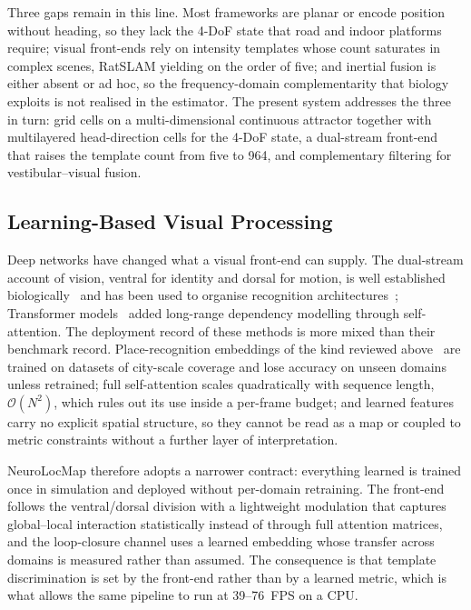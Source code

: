 Three gaps remain in this line. Most frameworks are planar or encode position without heading, so they lack the 4-DoF state that road and indoor platforms require; visual front-ends rely on intensity templates whose count saturates in complex scenes, RatSLAM yielding on the order of five; and inertial fusion is either absent or ad hoc, so the frequency-domain complementarity that biology exploits is not realised in the estimator. The present system addresses the three in turn: grid cells on a multi-dimensional continuous attractor together with multilayered head-direction cells for the 4-DoF state, a dual-stream front-end that raises the template count from five to 964, and complementary filtering for vestibular--visual fusion.

\subsection{Learning-Based Visual Processing}
\label{sec:related_learning}

Deep networks have changed what a visual front-end can supply. The dual-stream account of vision, ventral for identity and dorsal for motion, is well established biologically~\cite{Goodale1992,Mishkin1983} and has been used to organise recognition architectures~\cite{DiCarlo2012,Duffy1998}; Transformer models~\cite{Vaswani2017} added long-range dependency modelling through self-attention. The deployment record of these methods is more mixed than their benchmark record. Place-recognition embeddings of the kind reviewed above~\cite{Arandjelovic2016} are trained on datasets of city-scale coverage and lose accuracy on unseen domains unless retrained; full self-attention scales quadratically with sequence length, $\mathcal{O}(N^2)$, which rules out its use inside a per-frame budget; and learned features carry no explicit spatial structure, so they cannot be read as a map or coupled to metric constraints without a further layer of interpretation.

NeuroLocMap therefore adopts a narrower contract: everything learned is trained once in simulation and deployed without per-domain retraining. The front-end follows the ventral/dorsal division with a lightweight modulation that captures global--local interaction statistically instead of through full attention matrices, and the loop-closure channel uses a learned embedding whose transfer across domains is measured rather than assumed. The consequence is that template discrimination is set by the front-end rather than by a learned metric, which is what allows the same pipeline to run at 39--76~FPS on a CPU.

